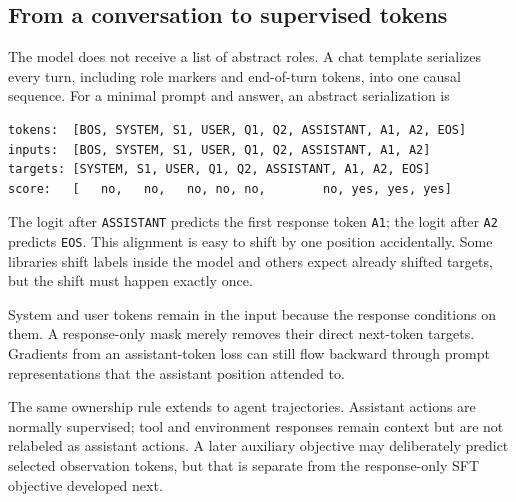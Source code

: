 \subsection{From a conversation to supervised tokens}

The model does not receive a list of abstract roles. A chat template serializes every
turn, including role markers and end-of-turn tokens, into one causal sequence. For a
minimal prompt and answer, an abstract serialization is
\begin{verbatim}
tokens:  [BOS, SYSTEM, S1, USER, Q1, Q2, ASSISTANT, A1, A2, EOS]
inputs:  [BOS, SYSTEM, S1, USER, Q1, Q2, ASSISTANT, A1, A2]
targets: [SYSTEM, S1, USER, Q1, Q2, ASSISTANT, A1, A2, EOS]
score:   [   no,   no,   no, no, no,        no, yes, yes, yes]
\end{verbatim}
The logit after \texttt{ASSISTANT} predicts the first response token \texttt{A1}; the
logit after \texttt{A2} predicts \texttt{EOS}. This alignment is easy to shift by one
position accidentally. Some libraries shift labels inside the model and others expect
already shifted targets, but the shift must happen exactly once.

System and user tokens remain in the input because the response conditions on them. A
response-only mask merely removes their direct next-token targets. Gradients from an
assistant-token loss can still flow backward through prompt representations that the
assistant position attended to.

The same ownership rule extends to agent trajectories. Assistant actions are normally
supervised; tool and environment responses remain context but are not relabeled as
assistant actions. A later auxiliary objective may deliberately predict selected
observation tokens, but that is separate from the response-only SFT objective developed
next.
